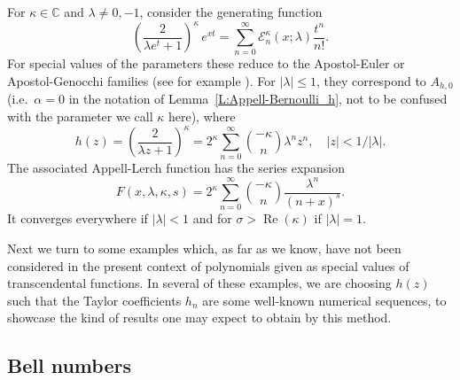 \documentclass[11pt,a4paper]{amsart}
\newcommand{\C}{\mathbb{C}}
\renewcommand{\Re}{\operatorname{Re}}
\theoremstyle{plain}
\theoremstyle{plain}
\theoremstyle{definition}
\theoremstyle{remark}
\begin{document}
For $\kappa \in \C$ and $\lambda \neq 0,-1$, consider the generating function 
\begin{equation*}
    \left(\frac{2}{\lambda e^t+1}\right)^\kappa\,e^{xt}
  = \sum_{n=0}^\infty \mathcal{E}^{\kappa}_{n}(x;\lambda)\frac{t^n}{n!}.
\end{equation*}
For special values of the parameters these reduce to the Apostol-Euler or Apostol-Genocchi families (see for example \cite{NRV-MC}). For $|\lambda|\leq 1$, they correspond to $A_{h,0}$ (i.e.\ $\alpha = 0$ in the notation of Lemma~\ref{L:Appell-Bernoulli_h}, not to be confused with the parameter we call $\kappa$ here), where
\[
	  h(z)
	= \left(\frac{2}{\lambda z+1}\right)^{\kappa}
	= 2^\kappa\sum_{n=0}^\infty \binom{-\kappa}{n}\lambda^nz^n,\quad |z|<1/|\lambda|.
\]
The associated Appell-Lerch function has the series expansion
\[
	  F(x,\lambda,\kappa,s)
	= 2^\kappa \sum_{n=0}^\infty \binom{-\kappa}{n} \frac{\lambda^n}{(n + x)^{s}}.
\]
It converges everywhere if $|\lambda| < 1$ and for $\sigma > \Re(\kappa)$ if $|\lambda| = 1$.


Next we turn to some examples which, as far as we know, have not been considered in the present context of polynomials given as special values of transcendental functions. In several of these examples, we are choosing $h(z)$ such that the Taylor coefficients $h_{n}$ are some well-known numerical sequences, to showcase the kind of results one may expect to obtain by this method.


\subsection{Bell numbers}
\label{subsec:Bell}
\end{document}
